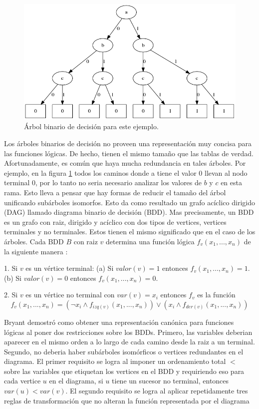 \begin{figure}[h!]
  \centering
  \includegraphics[width=1\textwidth]{Figures/BDT.png}
  \caption{Árbol binario de decisión para este ejemplo.}
  \label{fig:bdt1}
\end{figure}

Los árboles binarios de decisión no proveen una representación muy concisa para las funciones lógicas. De hecho, tienen el mismo tamaño que las tablas de verdad. Afortunadamente, es común que haya mucha redundancia en tales árboles. Por ejemplo, en la figura \ref{fig:bdt1} todos los caminos donde a tiene el valor 0 llevan al nodo terminal 0, por lo tanto no seria necesario analizar los valores de $b$ y $c$ en esta rama. Esto lleva a pensar que hay formas de reducir el tamaño del árbol unificando subárboles isomorfos. Esto da como resultado un grafo acíclico dirigido (DAG) llamado diagrama binario de decisión (BDD). Mas precisamente, un BDD es un grafo con raiz, dirigido y acíclico con dos tipos de vertices, vertices terminales y no terminales. Estos tienen el mismo significado que en el caso de los árboles. Cada BDD $B$ con raiz $v$ determina una función lógica $f_{v}(x_{1},...,x_{n})$ de la siguiente manera \cite{Clarke:1}:

1. Si $v$ es un vértice terminal:
  (a) Si $valor(v) = 1$ entonces $f_{v}(x_{1},...,x_{n}) = 1$.
  (b) Si $valor(v) = 0$ entonces $f_{v}(x_{1},...,x_{n}) = 0$.

2. Si $v$ es un vértice no terminal con $var(v) = x_{i}$ entonces $f_{v}$ es la función 
\[f_{v}(x_{1},...,x_{n}) = (\neg x_{i} \land f_{izq(v)}(x_{1},...,x_{n})) \lor (x_{i} \land f_{der(v)}(x_{1},...,x_{n}))\]

Bryant demostró como obtener una representación canónica para funciones lógicas al poner dos restricciones sobre los BDDs. Primero, las variables deberian aparecer en el mismo orden a lo largo de cada camino desde la raiz a un terminal. Segundo, no deberia haber subárboles isomórficos o vertices redundantes en el diagrama. El primer requisito se logra al imponer un ordenamiento total $<$ sobre las variables que etiquetan los vertices en el BDD y requiriendo eso para cada vertice $u$ en el diagrama, si $u$ tiene un sucesor no terminal, entonces $var(u) < var(v)$. El segundo requisito se logra al aplicar repetidamente tres reglas de transformación que no alteran la función representada por el diagrama

